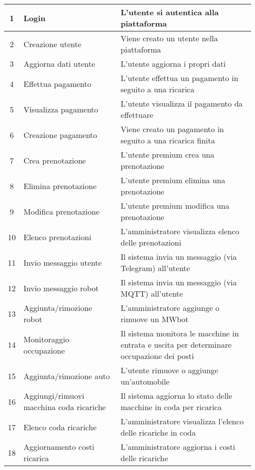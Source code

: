 \documentclass{article}
\begin{document}
    \begin{longtable}{|c|p{3cm}|p{7cm}|}
        \hline
         1 & Login & L'utente si autentica alla piattaforma \\
         \hline
         2 & Creazione utente & Viene creato un utente nella piattaforma \\
         \hline
         3 & Aggiorna dati utente & L'utente aggiorna i propri dati \\
         \hline
         4 & Effettua pagamento & L'utente effettua un pagamento in seguito a una ricarica \\
         \hline
         5 & Visualizza pagamento & L'utente visualizza il pagamento da effettuare \\
         \hline
         6 & Creazione pagamento & Viene creato un pagamento in seguito a una ricarica finita \\
         \hline
         7 & Crea prenotazione & L'utente premium crea una prenotazione \\
         \hline
         8 & Elimina prenotazione & L'utente premium elimina una prenotazione \\
         \hline
         9 & Modifica prenotazione & L'utente premium modifica una prenotazione \\
         \hline
         10 & Elenco prenotazioni & L'amministratore visualizza elenco delle prenotazioni \\
         \hline
         11 & Invio messaggio utente & Il sistema invia un messaggio (via Telegram) all'utente \\
         \hline
         12 & Invio messaggio robot & Il sistema invia un messaggio (via MQTT) all'utente \\
         \hline
         13 & Aggiunta/rimozione robot & L'amministratore aggiunge o rimuove un MWbot \\
         \hline
         14 & Monitoraggio occupazione & Il sistema monitora le macchine in entrata e uscita per determinare occupazione dei posti \\
         \hline
         15 & Aggiunta/rimozione auto & L'utente rimuove o aggiunge un'automobile \\
         \hline
         16 & Aggiungi/rimuovi macchina coda ricariche & Il sistema aggiorna lo stato delle macchine in coda per ricarica \\
         \hline
         17 & Elenco coda ricariche & L'amministratore visualizza l'elenco delle ricariche in coda \\
         \hline
         18 & Aggiornamento costi ricarica & L'amministratore aggiorna i costi delle ricariche \\

\end{longtable}
\end{document}
